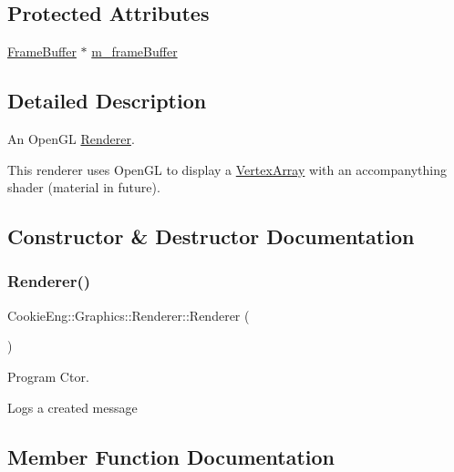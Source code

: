 \subsection*{Protected Attributes}
\begin{DoxyCompactItemize}
\item 
\hyperlink{class_cookie_eng_1_1_graphics_1_1_frame_buffer}{Frame\+Buffer} $\ast$ \hyperlink{class_cookie_eng_1_1_graphics_1_1_renderer_a64f992d6d2476fe2ea641f31a46f006e}{m\+\_\+frame\+Buffer}
\end{DoxyCompactItemize}


\subsection{Detailed Description}
An Open\+GL \hyperlink{class_cookie_eng_1_1_graphics_1_1_renderer}{Renderer}. 

This renderer uses Open\+GL to display a \hyperlink{class_cookie_eng_1_1_graphics_1_1_vertex_array}{Vertex\+Array} with an accompanything shader (material in future). 

\subsection{Constructor \& Destructor Documentation}
\mbox{\label{class_cookie_eng_1_1_graphics_1_1_renderer_a255e78964e0d0ff7efd26e60a6612f39}} 
\subsubsection{\texorpdfstring{Renderer()}{Renderer()}}
{\footnotesize\ttfamily Cookie\+Eng\+::\+Graphics\+::\+Renderer\+::\+Renderer (\begin{DoxyParamCaption}{ }\end{DoxyParamCaption})}



Program Ctor. 

Logs a created message 

\subsection{Member Function Documentation}
\mbox{\label{class_cookie_eng_1_1_graphics_1_1_renderer_aa32e62971f191a434ab457f9ac84ac31}} 
